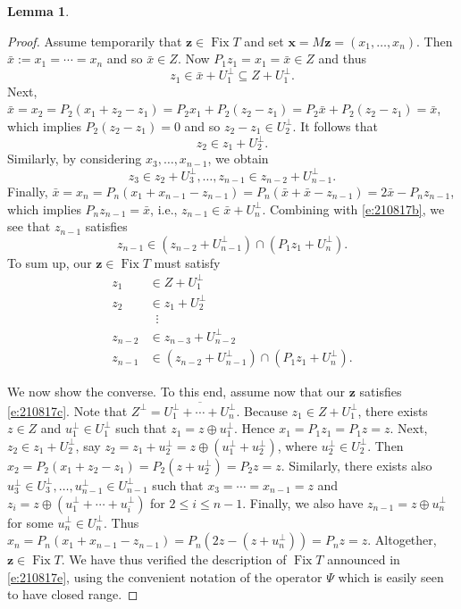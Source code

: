 \documentclass[11pt]{article}
\newcommand{\bx}{\ensuremath{\mathbf{x}}}
\newcommand{\bz}{\ensuremath{\mathbf{z}}}
\newcommand{\Fix}{\ensuremath{\operatorname{Fix}}}
\theoremstyle{definition}
\newtheorem{lemma}[theorem]{Lemma}
\begin{document}
{\begin{lemma}
\end{lemma}
\begin{proof}
Assume temporarily that $\bz\in\Fix T$ and 
set $\bx = M\bz = (x_1,\ldots,x_n)$. 
Then $\bar{x} := x_1=\cdots= x_n$ and so $\bar{x}\in Z$.
Now $P_1z_1=x_1=\bar{x}\in Z$ and thus 
\begin{equation*}
z_1 \in \bar{x}+U_1^\perp \subseteq Z + U_1^\perp.
\end{equation*}
Next, 
$\bar{x}=x_2 = P_2(x_1+z_2-z_1)=
P_2x_1 + P_2(z_2 - z_1)=
P_2\bar{x}+P_2(z_2-z_1) = \bar{x}$,
which implies $P_2(z_2-z_1)=0$ and so 
$z_2-z_1\in U_2^\perp$. 
It follows that 
\begin{equation*}
z_2 \in z_1+U_2^\perp.
\end{equation*}
Similarly, by considering $x_3,\ldots,x_{n-1}$, we obtain 
\begin{equation}
\label{e:210817b}
z_3\in z_2 + U_3^\perp, \ldots, z_{n-1}\in z_{n-2}+U_{n-1}^\perp.
\end{equation}
Finally, 
$\bar{x}=x_n=P_n(x_1+x_{n-1}-z_{n-1})=P_n(\bar{x}+\bar{x}-z_{n-1})
=2\bar{x}-P_nz_{n-1}$,
which implies $P_nz_{n-1}=\bar{x}$, i.e., 
$z_{n-1}\in \bar{x}+U_n^\perp$. 
Combining with \cref{e:210817b}, we see that 
$z_{n-1}$ satisfies
\begin{equation*}
z_{n-1}\in (z_{n-2}+U_{n-1}^\perp)\cap(P_1z_1+U_n^\perp).
\end{equation*}
To sum up, our $\bz\in \Fix T$ must satisfy
\begin{subequations}
\label{e:210817c}
\begin{align}
z_1 &\in Z + U_1^\perp\\
z_2 &\in z_1+U_2^\perp\\
&\;\;\vdots\\
z_{n-2}&\in z_{n-3}+U_{n-2}^\perp\\
z_{n-1}&\in (z_{n-2}+U_{n-1}^\perp)\cap(P_1z_1+U_n^\perp). 
\end{align}
\end{subequations}

We now show the converse. 
To this end, assume now that our $\bz$ satisfies \cref{e:210817c}. 
Note that $Z^\perp = \overline{U_1^\perp+\cdots + U_n^\perp}$.
Because $z_1 \in Z+U_1^\perp$,
there exists $z\in Z$ and $u_1^\perp\in U_1^\perp$ such that 
$z_1 = z\oplus u_1^\perp$.
Hence $x_1=P_1z_1 = P_1z = z$. 
Next, 
$z_2\in z_1+U_2^\perp$, say 
$z_2=z_1+u_2^\perp = z\oplus(u_1^\perp+u_2^\perp)$,
where $u_2^\perp \in U_2^\perp$. 
Then 
$x_2 = P_2(x_1+z_2-z_1)=P_2(z+u_2^\perp)=P_2z = z$. 
Similarly, there exists also $u_3^\perp\in U_3^\perp,
\ldots,u_{n-1}^\perp\in U_{n-1}^\perp$ such that 
$x_3=\cdots=x_{n-1}=z$ and 
$z_i=z\oplus(u_1^\perp+\cdots +u_i^\perp)$ for 
$2\leq i\leq n-1$. 
Finally, we also have $z_{n-1}=z\oplus u_n^\perp$
for some $u_n^\perp\in U_n^\perp$. 
Thus
$x_n = P_n(x_1+x_{n-1}-z_{n-1})=P_n(2z-(z+u_{n}^\perp))
=P_nz = z$. Altogether, $\bz \in \Fix T$.
We have thus verified the description of $\Fix T$ 
announced in \cref{e:210817e}, using the convenient
notation of the operator $\Psi$ which is easily seen to have closed range.


\end{proof}}
\end{document}
